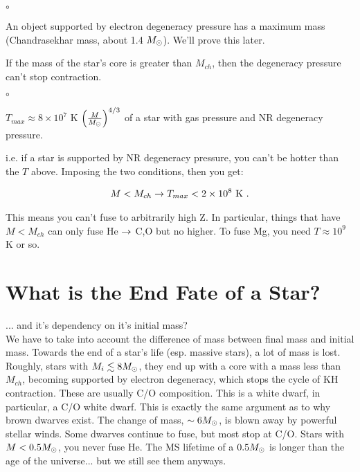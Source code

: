 \begin{list}{$\circ$}{}
\item An object supported by electron degeneracy pressure has a maximum mass (Chandrasekhar mass, about 1.4 $M_\odot$). We'll prove this later. 
\end{list}

\noindent If the mass of the star's core is greater than $M_{ch}$, then the degeneracy pressure can't stop contraction. 

\begin{list}{$\circ$}{}
\item $T_{max} \approx 8 \times 10^7$ K $\left( \frac{M}{M_\odot}\right)^{4/3}$ of a star with gas pressure and NR degeneracy pressure.
\end{list}

\noindent i.e. if a star is supported by NR degeneracy pressure, you can't be hotter than the $T$ above. Imposing the two conditions, then you get:

\begin{align}
M < M_{ch} \rightarrow T_{max} < 2 \times 10^8\textrm{ K}~.
\end{align}

\noindent This means you can't fuse to arbitrarily high Z. In particular, things that have $M<M_{ch}$ can only fuse He $\rightarrow$ C,O but no higher. To fuse Mg, you need $T \approx 10^9$ K or so. 

\section{What is the End Fate of a Star?}

... and it's dependency on it's initial mass?\\

We have to take into account the difference of mass between final mass and initial mass. Towards the end of a star's life (esp. massive stars), a lot of mass is lost. Roughly, stars with $M_i \lesssim 8 M_\odot$, they end up with a core with a mass less than $M_{ch}$, becoming supported by electron degeneracy, which stops the cycle of KH contraction. These are usually C/O composition. This is a white dwarf, in particular, a C/O white dwarf. This is exactly the same argument as to why brown dwarves exist. The change of mass, $\sim 6M_\odot$, is blown away by powerful stellar winds. Some dwarves continue to fuse, but most stop at C/O. Stars with $M < 0.5 M_\odot$, you never fuse He. The MS lifetime of a $0.5 M_\odot$ is longer than the age of the universe... but we still see them anyways. 


